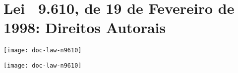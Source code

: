 
\graphicspath{%
  {./Post-Textual/}%
  {./Post-Textual/Illustrations/}%
}

\chapter{Lei \No\ 9.610, de 19 de Fevereiro de 1998: Direitos Autorais}%
\label{chpt:anx-a}

\noindent%
\texttt{[image: doc-law-n9610]}

\newpage%

\noindent%
\texttt{[image: doc-law-n9610]}

